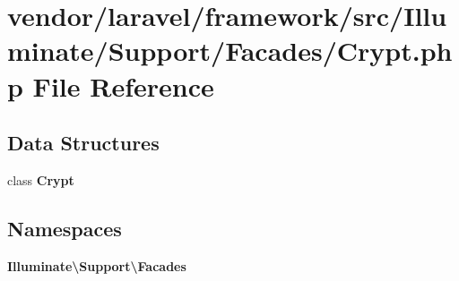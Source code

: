 \section{vendor/laravel/framework/src/\+Illuminate/\+Support/\+Facades/\+Crypt.php File Reference}
\label{_crypt_8php}
\subsection*{Data Structures}
\begin{DoxyCompactItemize}
\item 
class {\bf Crypt}
\end{DoxyCompactItemize}
\subsection*{Namespaces}
\begin{DoxyCompactItemize}
\item 
 {\bf Illuminate\textbackslash{}\+Support\textbackslash{}\+Facades}
\end{DoxyCompactItemize}
